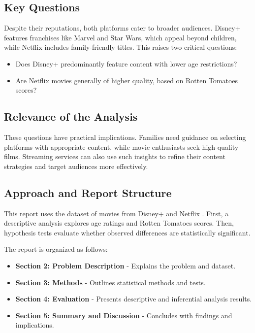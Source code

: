 \documentclass[a4paper, 12pt]{article}
\begin{document}
\subsection{Key Questions}

Despite their reputations, both platforms cater to broader audiences. Disney+ features franchises like Marvel and Star Wars, which appeal beyond children, while Netflix includes family-friendly titles. This raises two critical questions:
\begin{itemize}
    \item Does Disney+ predominantly feature content with lower age restrictions?
    \item Are Netflix movies generally of higher quality, based on Rotten Tomatoes scores?
\end{itemize}

\subsection{Relevance of the Analysis}

These questions have practical implications. Families need guidance on selecting platforms with appropriate content, while movie enthusiasts seek high-quality films. Streaming services can also use such insights to refine their content strategies and target audiences more effectively. \cite{Nielsen2021}

\subsection{Approach and Report Structure}

This report uses the dataset of movies from Disney+ and Netflix \cite{dataset}. First, a descriptive analysis explores age ratings and Rotten Tomatoes scores. Then, hypothesis tests evaluate whether observed differences are statistically significant.

The report is organized as follows:
\begin{itemize}
    \item \textbf{Section 2: Problem Description} - Explains the problem and dataset.
    \item \textbf{Section 3: Methods} - Outlines statistical methods and tests.
    \item \textbf{Section 4: Evaluation} - Presents descriptive and inferential analysis results.
    \item \textbf{Section 5: Summary and Discussion} - Concludes with findings and implications.
\end{itemize}
\end{document}
